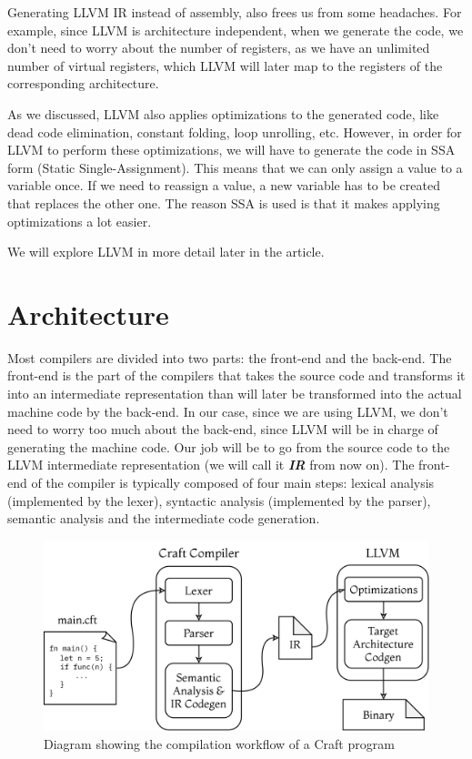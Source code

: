 ﻿\documentclass[10pt,a4paper,twocolumn,twoside]{article}
\begin{document}
Generating LLVM IR instead of assembly, also frees us from some headaches. For
example, since LLVM is architecture independent, when we generate the code, we
don't need to worry about the number of registers, as we have an unlimited
number of virtual registers, which LLVM will later map to the registers of the
corresponding architecture.

As we discussed, LLVM also applies optimizations to the generated code, like
dead code elimination, constant folding, loop unrolling, etc. However, in order
for LLVM to perform these optimizations, we will have to generate the code in
SSA form (Static Single-Assignment). This means that we can only assign a value
to a variable once. If we need to reassign a value, a new variable has to be
created that replaces the other one. The reason SSA is used is that it makes
applying optimizations a lot easier.

We will explore LLVM in more detail later in the article.

\section{Architecture}
Most compilers are divided into two parts: the front-end and the back-end. The
front-end is the part of the compilers that takes the source code and transforms
it into an intermediate representation than will later be transformed into the
actual machine code by the back-end. In our case, since we are using LLVM, we
don't need to worry too much about the back-end, since LLVM will be in charge of
generating the machine code. Our job will be to go from the source code to the
LLVM intermediate representation (we will call it \textbf{\textit{IR}} from now
on). The front-end of the compiler is typically composed of four main steps:
lexical analysis (implemented by the lexer), syntactic analysis (implemented by
the parser), semantic analysis and the intermediate code generation.

\begin{figure}[ht]
\centering
\captionsetup{justification=centering,margin=1cm}
\includegraphics[width=\linewidth]{arch}
\caption{Diagram showing the compilation workflow of a Craft program}
\end{figure}
\end{document}
